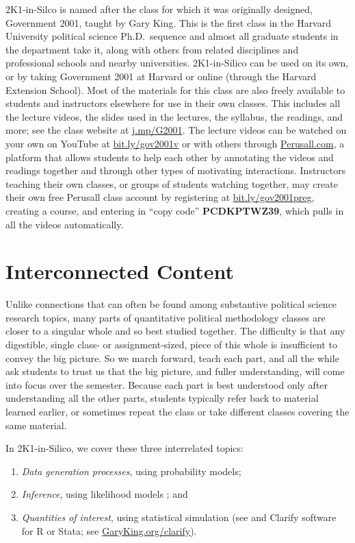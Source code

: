 \documentclass[12pt]{article}
\theoremstyle{definition}
\begin{document}
2K1-in-Silco is named after the class for which it was originally designed, Government 2001, taught by Gary King. This is the first class in the Harvard University political science Ph.D.\ sequence and almost all graduate students in the department take it, along with others from related disciplines and professional schools and nearby universities. 2K1-in-Silico can be used on its own, or by taking Government 2001 at Harvard or online (through the Harvard Extension School).  Most of the materials for this class are also freely available to students and instructors elsewhere for use in their own classes. This includes all the lecture videos, the slides used in the lectures, the syllabus, the readings, and more; see the class website at \href{https://j.mp/G2001}{j.mp/G2001}. The lecture videos can be watched on your own on YouTube at \href{https://bit.ly/gov2001v}{bit.ly/gov2001v} or with others through \href{https://perusall.com}{Perusall.com}, a platform that allows students to help each other by annotating the videos and readings together and through other types of motivating interactions. Instructors teaching their own classes, or groups of students watching together, may create their own free Perusall class account by registering at \href{https://bit.ly/gov2001preg}{bit.ly/gov2001preg}, creating a course, and entering in ``copy code'' \textbf{PCDKPTWZ39}, which pulls in all the videos automatically.

\section{Interconnected Content}

Unlike connections that can often be found among substantive political science research topics, many parts of quantitative political methodology classes are closer to a singular whole and so best studied together. The difficulty is that any digestible, single class- or assignment-sized, piece of this whole is insufficient to convey the big picture. So we march forward, teach each part, and all the while ask students to trust us that the big picture, and fuller understanding, will come into focus over the semester. Because each part is best understood only after understanding all the other parts, students typically refer back to material learned earlier, or sometimes repeat the class or take different classes covering the same material.

In 2K1-in-Silico, we cover these three interrelated topics:
\begin{enumerate}\singlespacing
  \item \emph{Data generation processes}, using probability models;
  \item \emph{Inference}, using likelihood models \citep{King98}; and
  \item \emph{Quantities of interest}, using statistical simulation (see \citealt{KinTomWit00} and Clarify software for R or Stata; see \href{https://GaryKing.org/clarify}{GaryKing.org/clarify}).
\end{enumerate}
\end{document}
